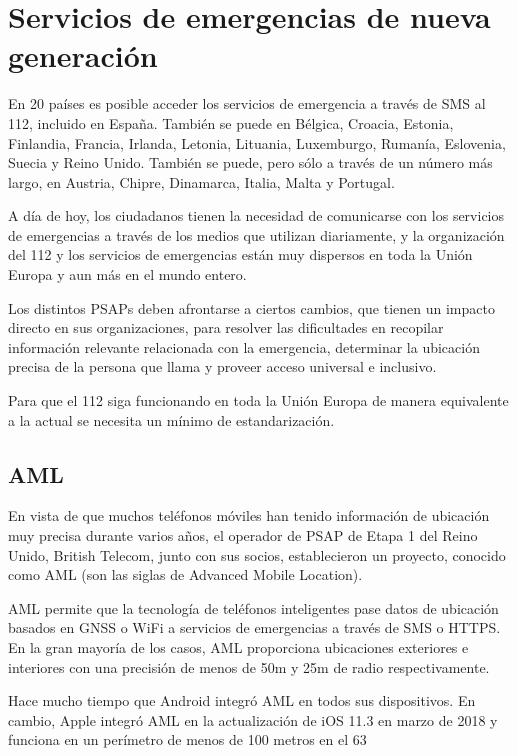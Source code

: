 \section{Servicios de emergencias de nueva generación}

En 20 países es posible acceder los servicios de emergencia a través de SMS al 112, incluido en España. También se puede en Bélgica, Croacia, Estonia, Finlandia, Francia, Irlanda, Letonia, Lituania, Luxemburgo, Rumanía, Eslovenia, Suecia y Reino Unido. También se puede, pero sólo a través de un número más largo, en Austria, Chipre, Dinamarca, Italia, Malta y Portugal.

A día de hoy, los ciudadanos tienen la necesidad de comunicarse con los servicios de emergencias a través de los medios que utilizan diariamente, y la organización del 112 y los servicios de emergencias están muy dispersos en toda la Unión Europa y aun más en el mundo entero.

Los distintos PSAPs deben afrontarse a ciertos cambios, que tienen un impacto directo en sus organizaciones, para resolver las dificultades en recopilar información relevante relacionada con la emergencia, determinar la ubicación precisa de la persona que llama y proveer acceso universal e inclusivo.

Para que el 112 siga funcionando en toda la Unión Europa de manera equivalente a la actual se necesita un mínimo de estandarización.

\subsection{AML}

En vista de que muchos teléfonos móviles han tenido información de ubicación muy precisa durante varios años, el operador de PSAP de Etapa 1 del Reino Unido, British Telecom, junto con sus socios, establecieron un proyecto, conocido como AML (son las siglas de Advanced Mobile Location).

AML permite que la tecnología de teléfonos inteligentes pase datos de ubicación basados en GNSS o WiFi a servicios de emergencias a través de SMS o HTTPS. En la gran mayoría de los casos, AML proporciona ubicaciones exteriores e interiores con una precisión de menos de 50m y 25m de radio respectivamente.

Hace mucho tiempo que Android integró AML en todos sus dispositivos. En cambio, Apple integró AML en la actualización de iOS 11.3 en marzo de 2018 y funciona en un perímetro de menos de 100 metros en el 63%

